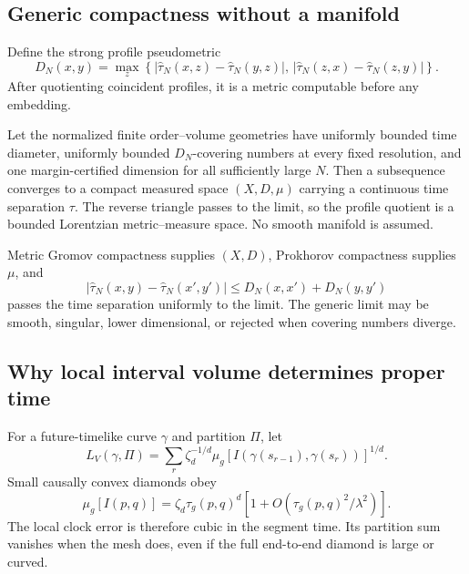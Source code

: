 \subsection{Generic compactness without a manifold}

Define the strong profile pseudometric
\begin{equation}
 D_N(x,y)=\max_z\left\{
 |\widehat\tau_N(x,z)-\widehat\tau_N(y,z)|,\,
 |\widehat\tau_N(z,x)-\widehat\tau_N(z,y)|
 \right\}.
 \label{eq:generic-strong-profile}
\end{equation}
After quotienting coincident profiles, it is a metric computable before any
embedding.

\begin{theorem}
\label{thm:generic-order-volume-compactness}
Let the normalized finite order--volume geometries have uniformly bounded
time diameter, uniformly bounded \(D_N\)-covering numbers at every fixed
resolution, and one margin-certified dimension for all sufficiently large
\(N\).  Then a subsequence converges to a compact measured space
\((X,D,\mu)\) carrying a continuous time separation \(\tau\).  The reverse
triangle passes to the limit, so the profile quotient is a bounded
Lorentzian metric--measure space.  No smooth manifold is assumed.
\end{theorem}

Metric Gromov compactness supplies \((X,D)\), Prokhorov compactness supplies
\(\mu\), and
\[
 |\widehat\tau_N(x,y)-\widehat\tau_N(x',y')|
 \le D_N(x,x')+D_N(y,y')
\]
passes the time separation uniformly to the limit.  The generic limit may be
smooth, singular, lower dimensional, or rejected when covering numbers
diverge.

\subsection{Why local interval volume determines proper time}

For a future-timelike curve \(\gamma\) and partition \(\Pi\), let
\begin{equation}
 L_V(\gamma,\Pi)=\sum_r
 \zeta_d^{-1/d}
 \mu_g[I(\gamma(s_{r-1}),\gamma(s_r))]^{1/d}.
 \label{eq:generic-continuum-clock}
\end{equation}
Small causally convex diamonds obey
\[
 \mu_g[I(p,q)]
 =\zeta_d\tau_g(p,q)^d
 \left[1+O(\tau_g(p,q)^2/\lambda^2)\right].
\]
The local clock error is therefore cubic in the segment time.  Its partition
sum vanishes when the mesh does, even if the full end-to-end diamond is large
or curved.

